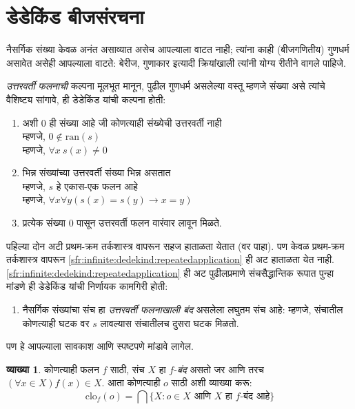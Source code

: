 \documentclass[11pt,a4paper,openany]{book}
\theoremstyle{definition}
\newtheorem{defn}{व्याख्या}[section]
\newcommand{\Setabs}[2]{\{#1:#2\}}
\newcommand{\lif}{\mathbin{\to}}
\newcommand{\ran}[1]{\mathrm{ran}(#1)}
\newcommand{\closureofunder}[2]{\mathrm{clo}_{#1}(#2)}
\begin{document}
\section{डेडेकिंड बीजसंरचना}\label{sfr:infinite:dedekind:sec}

नैसर्गिक संख्या केवळ अनंत असाव्यात असेच आपल्याला वाटत नाही; त्यांना काही
(बीजगणितीय) गुणधर्म असावेत असेही आपल्याला वाटते: बेरीज, गुणाकार इत्यादी
क्रियांखाली त्यांनी योग्य रीतीने वागले पाहिजे.

\emph{उत्तरवर्ती फलनाची} कल्पना मूलभूत मानून, पुढील गुणधर्म असलेल्या
वस्तू म्हणजे संख्या असे त्यांचे वैशिष्ट्य सांगावे, ही डेडेकिंड यांची
कल्पना होती:
\begin{enumerate}
	\item अशी $0$ ही संख्या आहे जी कोणत्याही संख्येची उत्तरवर्ती नाही
	\\म्हणजे, $0 \notin \ran{s}$
	\\म्हणजे, $\forall x\ s(x) \neq 0$
	\item भिन्न संख्यांच्या उत्तरवर्ती संख्या भिन्न असतात
	\\म्हणजे, $s$ हे एकास-एक फलन आहे
	\\म्हणजे, $\forall x \forall y (s(x) = s(y) \lif x = y)$
	\item\label{sfr:infinite:dedekind:repeatedapplication} प्रत्येक संख्या $0$ पासून
	उत्तरवर्ती फलन वारंवार लावून मिळते.
\end{enumerate}
पहिल्या दोन अटी प्रथम-क्रम तर्कशास्त्र वापरून सहज हाताळता येतात (वर
पाहा). पण केवळ प्रथम-क्रम तर्कशास्त्र वापरून \ref{sfr:infinite:dedekind:repeatedapplication}
ही अट हाताळता येत नाही. \ref{sfr:infinite:dedekind:repeatedapplication} ही अट पुढीलप्रमाणे
संचसैद्धान्तिक रूपात पुन्हा मांडणे ही डेडेकिंड यांची निर्णायक कामगिरी होती:
\begin{enumerate}
	\item[3$'$.] नैसर्गिक संख्यांचा संच हा \emph{उत्तरवर्ती फलनाखाली
	बंद} असलेला लघुतम संच आहे: म्हणजे, संचातील कोणत्याही घटक वर
	$s$ लावल्यास संचातीलच दुसरा घटक मिळतो.
\end{enumerate}
पण हे आपल्याला सावकाश आणि स्पष्टपणे मांडावे लागेल.

\begin{defn}\label{sfr:infinite:dedekind:Closure}
	कोणत्याही फलन $f$ साठी, संच $X$ हा $f$-\emph{बंद} असतो जर आणि तरच
	$(\forall x \in X)f(x) \in X$. आता कोणत्याही $o$ साठी अशी व्याख्या करू:
	$$\closureofunder{f}{o} = \bigcap\Setabs{X}{o \in X\text{ आणि }X
\text{ हा $f$-बंद आहे}}$$
\end{defn}
\end{document}
